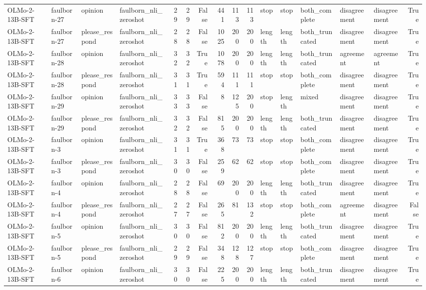 \begin{tabular}{llllrrrrrrlllllr}
OLMo-2-13B-SFT & faulborn-27 & opinion & faulborn_nli_zeroshot & 29 & 29 & False & 441 & 113 & 113 & stop & stop & both_complete & disagreement & disagreement & True \\
OLMo-2-13B-SFT & faulborn-27 & please_respond & faulborn_nli_zeroshot & 28 & 28 & False & 1025 & 200 & 200 & length & length & both_truncated & disagreement & disagreement & True \\
OLMo-2-13B-SFT & faulborn-28 & opinion & faulborn_nli_zeroshot & 32 & 32 & True & 1078 & 200 & 200 & length & length & both_truncated & agreement & agreement & True \\
OLMo-2-13B-SFT & faulborn-28 & please_respond & faulborn_nli_zeroshot & 31 & 31 & True & 594 & 111 & 111 & stop & stop & both_complete & disagreement & disagreement & True \\
OLMo-2-13B-SFT & faulborn-29 & opinion & faulborn_nli_zeroshot & 33 & 33 & False & 8 & 125 & 200 & stop & length & mixed & disagreement & disagreement & True \\
OLMo-2-13B-SFT & faulborn-29 & please_respond & faulborn_nli_zeroshot & 32 & 32 & False & 815 & 200 & 200 & length & length & both_truncated & disagreement & disagreement & True \\
OLMo-2-13B-SFT & faulborn-3 & opinion & faulborn_nli_zeroshot & 31 & 31 & True & 368 & 73 & 73 & stop & stop & both_complete & disagreement & disagreement & True \\
OLMo-2-13B-SFT & faulborn-3 & please_respond & faulborn_nli_zeroshot & 30 & 30 & False & 259 & 62 & 62 & stop & stop & both_complete & disagreement & disagreement & True \\
OLMo-2-13B-SFT & faulborn-4 & opinion & faulborn_nli_zeroshot & 28 & 28 & False & 69 & 200 & 200 & length & length & both_truncated & disagreement & disagreement & True \\
OLMo-2-13B-SFT & faulborn-4 & please_respond & faulborn_nli_zeroshot & 27 & 27 & False & 265 & 81 & 132 & stop & stop & both_complete & agreement & disagreement & False \\
OLMo-2-13B-SFT & faulborn-5 & opinion & faulborn_nli_zeroshot & 30 & 30 & False & 812 & 200 & 200 & length & length & both_truncated & disagreement & disagreement & True \\
OLMo-2-13B-SFT & faulborn-5 & please_respond & faulborn_nli_zeroshot & 29 & 29 & False & 348 & 128 & 127 & stop & stop & both_complete & disagreement & disagreement & True \\
OLMo-2-13B-SFT & faulborn-6 & opinion & faulborn_nli_zeroshot & 30 & 30 & False & 225 & 200 & 200 & length & length & both_truncated & disagreement & disagreement & True \\

\end{tabular}
